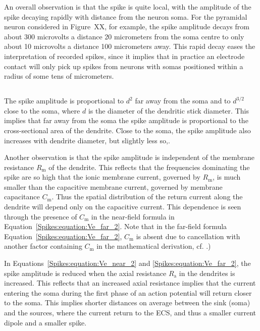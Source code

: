 An overall observation is that the spike is quite local, with the amplitude of the spike decaying rapidly with distance from the neuron soma. 
For the pyramidal neuron considered in Figure~XX, for example, the spike amplitude decays from about
300 microvolts a distance 20 micrometers from the soma centre to only about 10 microvolts a
distance 100 micrometers away. 
This rapid decay eases the interpretation of recorded spikes, since it implies
that in practice an electrode contact will only pick up spikes from neurons with somas positioned within a radius of some tens of micrometers.

\subsection{}
The spike amplitude is proportional to $d^{2}$ far away from the soma and to $d^{3/2}$ close to the soma,
where $d$ is the diameter of the dendritic stick diameter. This implies that far away from the soma the spike amplitude is proportional to  the cross-sectional area of the dendrite. Close to the soma, the spike amplitude also increases with dendrite diameter, but slightly less so,.

Another observation is that the spike amplitude is independent of the membrane resistance $R_\mathrm{m}$ of the dendrite.
This reflects that the frequencies dominating the spike are so high that the ionic membrane current, governed by $R_\mathrm{m}$, is
much smaller than the capacitive membrane current, governed by membrane capacitance $C_\mathrm{m}$.  
Thus the spatial distribution of the return current along the dendrite will depend only on the capacitive current. This dependence
is seen through the presence of  $C_\mathrm{m}$ in the near-field formula in Equation~\ref{Spikes:equation:Ve_far_2}. 
Note that in the far-field formula Equation~\ref{Spikes:equation:Ve_far_2},  $C_\mathrm{m}$ is absent due to cancellation with another factor containing $C_\mathrm{m}$ in the mathematical derivation, 
cf. .)

In Equations~\ref{Spikes:equation:Ve_near_2} and \ref{Spikes:equation:Ve_far_2}, the spike amplitude is reduced when the 
axial resistance $R_\mathrm{a}$ in the dendrites is increased. This reflects that an increased axial resistance implies that the current entering
the soma during the first phase of an action potential will return closer to the soma. This implies shorter distances on average between the sink (soma) and the sources, where the current return to the ECS, and thus a smaller current dipole and a smaller spike.


